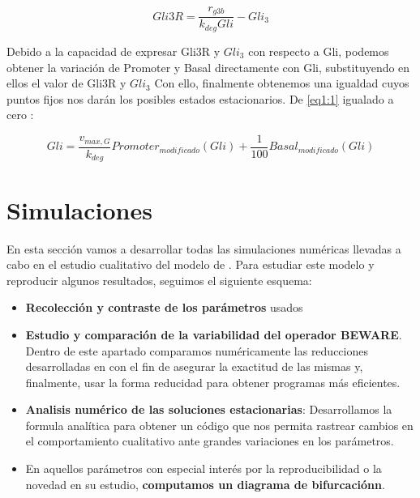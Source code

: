  \begin{equation}
 Gli3R=\frac{r_{g3b}}{k_{deg}Gli}-Gli_3
 \label{equgli3r}
 \end{equation}

Debido a la capacidad de expresar Gli3R y $Gli_3$ con respecto a Gli, podemos obtener la variación de Promoter y Basal directamente con Gli, substituyendo en ellos el valor de Gli3R y $Gli_3$
Con ello, finalmente obtenemos una igualdad cuyos puntos fijos nos darán los posibles estados estacionarios. De \ref{eq1:1} igualado a cero :

 \begin{equation}
 Gli=\frac{v_{max,G}}{k_{deg}}Promoter_{modificado}(Gli)+\frac{1}{100}Basal_{modificado}(Gli)
 \label{final_gli}
 \end{equation}


\section{Simulaciones}

En esta sección vamos a desarrollar todas las simulaciones numéricas llevadas a cabo en el estudio cualitativo del modelo de \cite{schaffer}.
Para estudiar este modelo y reproducir algunos resultados, seguimos el siguiente esquema:
\begin{itemize}
	\item \textbf{Recolección y contraste de los parámetros} usados
	\item \textbf{Estudio y comparación de la variabilidad del operador BEWARE}. Dentro de este apartado comparamos numéricamente las reducciones desarrolladas en \cite{multiple} con el fin de asegurar la exactitud de las mismas y, finalmente, usar la forma reducidad para obtener programas más eficientes.
	\item \textbf{Analisis numérico de las soluciones estacionarias}: Desarrollamos la formula analítica para obtener un código que nos permita rastrear cambios en el comportamiento cualitativo ante grandes variaciones en los parámetros.
	\item En aquellos parámetros con especial interés por la reproducibilidad o la novedad en su estudio, \textbf{computamos un diagrama de bifurcaciónn}.
\end{itemize}
